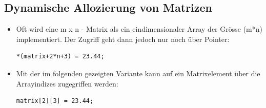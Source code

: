 \subsection{Dynamische Allozierung von Matrizen}
\begin{itemize}
	\item Oft wird eine m x n - Matrix als ein eindimensionaler Array der Grösse (m*n) implementiert. Der Zugriff geht dann jedoch nur noch über Pointer:\\
	\vspace{-\baselineskip}
\begin{minipage}{0.35\linewidth}
\begin{lstlisting}
*(matrix+2*n+3) = 23.44;
\end{lstlisting}
\end{minipage}
	\item Mit der im folgenden gezeigten Variante kann auf ein Matrixelement über die Arrayindizes zugegriffen werden:\\
	\vspace{-\baselineskip}
\begin{minipage}{0.35\linewidth}
\begin{lstlisting}
matrix[2][3] = 23.44;
\end{lstlisting}
\end{minipage}
\end{itemize}

